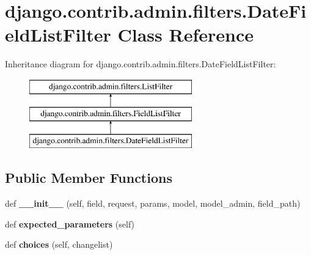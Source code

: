 \hypertarget{classdjango_1_1contrib_1_1admin_1_1filters_1_1_date_field_list_filter}{}\section{django.\+contrib.\+admin.\+filters.\+Date\+Field\+List\+Filter Class Reference}
\label{classdjango_1_1contrib_1_1admin_1_1filters_1_1_date_field_list_filter}
Inheritance diagram for django.\+contrib.\+admin.\+filters.\+Date\+Field\+List\+Filter\+:\begin{figure}[H]
\begin{center}
\leavevmode
\includegraphics[height=3.000000cm]{classdjango_1_1contrib_1_1admin_1_1filters_1_1_date_field_list_filter}
\end{center}
\end{figure}
\subsection*{Public Member Functions}
\begin{DoxyCompactItemize}
\item 
\mbox{\label{classdjango_1_1contrib_1_1admin_1_1filters_1_1_date_field_list_filter_a1cae63de7d381dab2ef15e3eb739fb7b}} 
def {\bfseries \+\_\+\+\_\+init\+\_\+\+\_\+} (self, field, request, params, model, model\+\_\+admin, field\+\_\+path)
\item 
\mbox{\label{classdjango_1_1contrib_1_1admin_1_1filters_1_1_date_field_list_filter_aaedeeb536076c81c0e7fc494c319f1af}} 
def {\bfseries expected\+\_\+parameters} (self)
\item 
\mbox{\label{classdjango_1_1contrib_1_1admin_1_1filters_1_1_date_field_list_filter_a3027529d84fcfd9c55a0da90c3cf6df5}} 
def {\bfseries choices} (self, changelist)
\end{DoxyCompactItemize}
